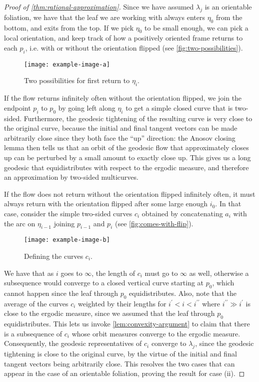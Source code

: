 \documentclass[12pt, reqno]{amsart}
\begin{document}
\begin{proof}[Proof of \autoref{thm:rational-approximation}]
  Since we have assumed $\lambda_j$ is an orientable foliation, we have that the leaf we are working with always enters $\eta_0$ from the bottom, and exits from the top.
  If we pick $\eta_0$ to be small enough, we can pick a local orientation, and keep track of how a positively oriented frame returns to each $p_i$, i.e. with or without the orientation flipped (see \autoref{fig:two-possibilities}).
  \begin{figure}[h]
    \centering
    \texttt{[image: example-image-a]}
    \caption{Two possibilities for first return to $\eta_i$.}
    \label{fig:two-possibilities}
  \end{figure}
  If the flow returns infinitely often without the orientation flipped, we join the endpoint $p_i$ to $p_0$ by going left along $\eta_i$ to get a simple closed curve that is two-sided.
  Furthermore, the geodesic tightening of the resulting curve is very close to the original curve, because the initial and final tangent vectors can be made arbitrarily close since they both face the ``up'' direction: the Anosov closing lemma then tells us that an orbit of the geodesic flow that approximately closes up can be perturbed by a small amount to exactly close up.
  This gives us a long geodesic that equidistributes with respect to the ergodic measure, and therefore an approximation by two-sided multicurves.

  If the flow does not return without the orientation flipped infinitely often, it must always return with the orientation flipped after some large enough $i_0$.
  In that case, consider the simple two-sided curves $c_i$ obtained by concatenating $a_i$ with the arc on $\eta_{i-1}$ joining $p_{i-1}$ and $p_i$ (see \autoref{fig:comes-with-flip}).
  \begin{figure}[h]
    \centering
    \texttt{[image: example-image-b]}
    \caption{Defining the curves $c_i$.}
    \label{fig:comes-with-flip}
  \end{figure}
  We have that as $i$ goes to $\infty$, the length of $c_i$ must go to $\infty$ as well, otherwise a subsequence would converge to a closed vertical curve starting at $p_0$, which cannot happen since the leaf through $p_0$ equidistributes.
  Also, note that the average of the curves $c_i$ weighted by their lengths for $i^{\prime} < i < i^{\prime \prime}$ where $i^{\prime \prime} \gg i^{\prime}$ is close to the ergodic measure, since we assumed that the leaf through $p_0$ equidistributes.
  This lets us invoke \autoref{lem:convexity-argument} to claim that there is a subsequence of $c_i$ whose orbit measures converge to the ergodic measure.
  Consequently, the geodesic representatives of $c_i$ converge to $\lambda_j$, since the geodesic tightening is close to the original curve, by the virtue of the initial and final tangent vectors being arbitrarily close.
  This resolves the two cases that can appear in the case of an orientable foliation, proving the result for case (ii).


\end{proof}
\end{document}
